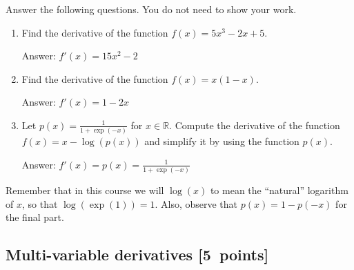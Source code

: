 \documentclass{article}
\newcommand{\blu}[1]{{\textcolor{blu}{#1}}}
\newenvironment{answer}{\par\begingroup\color{gre}Answer: }{\endgroup}
\let\ask\blu
\newcommand\pts[1]{\textcolor{pointscolour}{[#1~points]}}
\def\R{\mathbb{R}}
\begin{document}
  \ask{Answer the following questions.} You do not need to show your work.

  \begin{enumerate}
  \item Find the derivative of the function $f(x) = 5x^3 -2x + 5$.
  \begin{answer} 
    $f'(x) = 15x^2 - 2$
  \end{answer}
  \item Find the derivative of the function $f(x) = x(1-x)$.
  \begin{answer} 
    $f'(x) = 1 - 2x$
  \end{answer}
  \item Let $p(x) = \frac{1}{1+\exp(-x)}$ for $x \in \R$. Compute the derivative of the function $f(x) = x-\log(p(x))$ and simplify it by using the function $p(x)$.
  \begin{answer}
    $f'(x) = p(x) = \frac{1}{1+\exp(-x)}$
  \end{answer}
  \end{enumerate}
  Remember that in this course we will $\log(x)$ to mean the ``natural'' logarithm of $x$, so that $\log(\exp(1)) = 1$. Also, observe that $p(x) = 1-p(-x)$ for the final part.

  \subsection{Multi-variable derivatives \pts{5}}
  \label{sub.multi.var}
\end{document}
